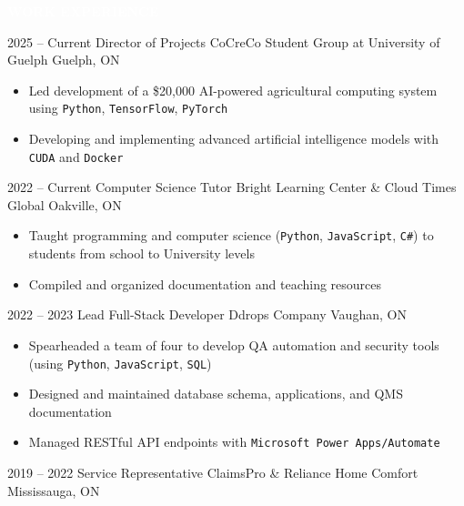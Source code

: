 \documentclass[9pt]{src/developercv} %
\begin{document}
	\vspace{\baselineskip} %
	\colorbox{sky900}{\textcolor{white}{\LARGE\MakeUppercase{\textbf{Work Experience}}}}
	\vspace{1.0\baselineskip}%

	\begin{entrylist}
		\atsentry
			{2025 -- Current}
			{Director of Projects}
			{CoCreCo Student Group at University of Guelph}
			{Guelph, ON}
			{
				\vspace{-1.0\baselineskip}
				\begin{itemize}
					\item Led development of a \$20,000 AI-powered agricultural computing system using \texttt{Python}, \texttt{TensorFlow}, \texttt{PyTorch}
					\item Developing and implementing advanced artificial intelligence models with \texttt{CUDA} and \texttt{Docker}
				\end{itemize}
			}
		\atsentry
			{2022 -- Current}
			{Computer Science Tutor}
			{Bright Learning Center \& Cloud Times Global}
			{Oakville, ON}
			{
				\vspace{-1.0\baselineskip}
				\begin{itemize}
					\item Taught programming and computer science (\texttt{Python}, \texttt{JavaScript}, \texttt{C\#}) to students from school to University levels
					\item Compiled and organized documentation and teaching resources
				\end{itemize}
			}
		\atsentry
			{2022 -- 2023}
			{Lead Full-Stack Developer}
			{Ddrops Company}
			{Vaughan, ON}
			{
				\vspace{-1.0\baselineskip}
				\begin{itemize}
					\item Spearheaded a team of four to develop QA automation and security tools (using \texttt{Python}, \texttt{JavaScript}, \texttt{SQL})
					\item Designed and maintained database schema, applications, and QMS documentation
					\item Managed RESTful API endpoints with \texttt{Microsoft Power Apps/Automate}
				\end{itemize}
			}
		\atsentry
			{2019 -- 2022}
			{Service Representative}
			{ClaimsPro \& Reliance Home Comfort}
			{Mississauga, ON}
			{
				\vspace{-1.0\baselineskip}
}
\end{entrylist}
\end{document}
